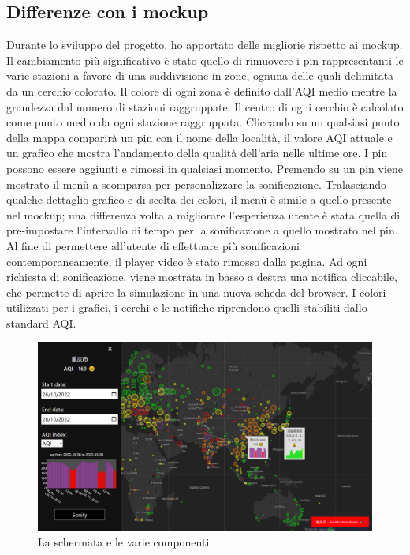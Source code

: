 \subsection{Differenze con i mockup}
Durante lo sviluppo del progetto, ho apportato delle migliorie rispetto ai mockup.
Il cambiamento più significativo è stato quello di rimuovere i pin rappresentanti le varie stazioni a favore di una suddivisione in zone, ognuna delle quali delimitata da un cerchio colorato.
Il colore di ogni zona è definito dall'AQI medio mentre la grandezza dal numero di stazioni raggruppate.
Il centro di ogni cerchio è calcolato come punto medio da ogni stazione raggruppata.
Cliccando su un qualsiasi punto della mappa comparirà un pin con il nome della località, il valore AQI attuale e un grafico che mostra l'andamento della qualità dell'aria nelle ultime ore.
I pin possono essere aggiunti e rimossi in qualsiasi momento.
Premendo su un pin viene mostrato il menù a scomparsa per personalizzare la sonificazione.
Tralasciando qualche dettaglio grafico e di scelta dei colori, il menù è simile a quello presente nel mockup; una differenza volta a migliorare l'esperienza utente è stata quella di pre-impostare l'intervallo di tempo per la sonificazione a quello mostrato nel pin.
Al fine di permettere all'utente di effettuare più sonificazioni contemporaneamente, il player video è stato rimosso dalla pagina.
Ad ogni richiesta di sonificazione, viene mostrata in basso a destra una notifica cliccabile, che permette di aprire la simulazione in una nuova scheda del browser.
I colori utilizzati per i grafici, i cerchi e le notifiche riprendono quelli stabiliti dallo standard AQI.
\begin{figure}[h]
  \includegraphics[width=\linewidth]{img/schermata.png}
  \caption{La schermata e le varie componenti}
  \label{fig:schermata}
\end{figure}
